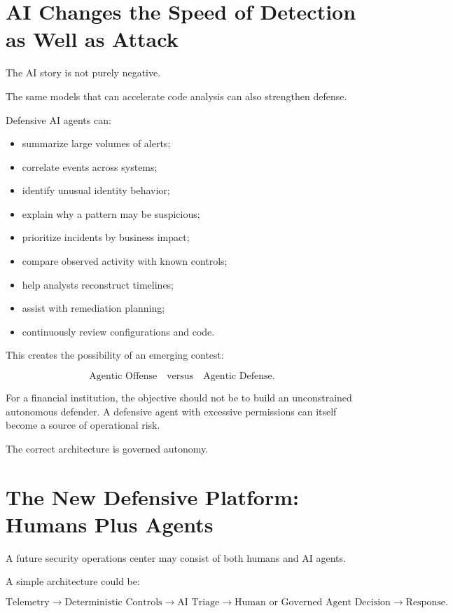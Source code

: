 \section{AI Changes the Speed of Detection as Well as Attack}

The AI story is not purely negative.

The same models that can accelerate code analysis can also strengthen defense.

Defensive AI agents can:

\begin{itemize}
    \item summarize large volumes of alerts;
    \item correlate events across systems;
    \item identify unusual identity behavior;
    \item explain why a pattern may be suspicious;
    \item prioritize incidents by business impact;
    \item compare observed activity with known controls;
    \item help analysts reconstruct timelines;
    \item assist with remediation planning;
    \item continuously review configurations and code.
\end{itemize}

This creates the possibility of an emerging contest:

\begin{equation}
\text{Agentic Offense}
\quad \text{versus} \quad
\text{Agentic Defense}.
\end{equation}

For a financial institution, the objective should not be to build an unconstrained autonomous defender. A defensive agent with excessive permissions can itself become a source of operational risk.

The correct architecture is governed autonomy.

\section{The New Defensive Platform: Humans Plus Agents}

A future security operations center may consist of both humans and AI agents.

A simple architecture could be:

\begin{equation}
\text{Telemetry}
\rightarrow
\text{Deterministic Controls}
\rightarrow
\text{AI Triage}
\rightarrow
\text{Human or Governed Agent Decision}
\rightarrow
\text{Response}.
\end{equation}

